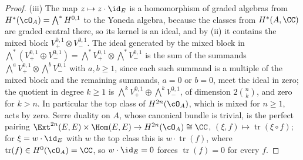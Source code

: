 \begin{proof}
(iii) The map $z\mapsto z\cdot\id_{E}$ is a homomorphism of graded algebras
from $H^{*}(\cO_{A})=\bigwedge^{*}H^{0,1}$ to the Yoneda algebra, because the
classes from $H^{*}(A,\CC)$ are graded central there, so its kernel is an
ideal, and by (ii) it contains the mixed block $V_{+}^{0,1}\otimes V_{-}^{0,1}$.
The ideal generated by the mixed block in $\bigwedge^{*}(V_{+}^{0,1}\oplus
V_{-}^{0,1})=\bigwedge^{*}V_{+}^{0,1}\otimes\bigwedge^{*}V_{-}^{0,1}$ is the
sum of the summands $\bigwedge^{a}V_{+}^{0,1}\otimes\bigwedge^{b}V_{-}^{0,1}$
with $a,b\ge1$, since each such summand is a multiple of the mixed block and
the remaining summands, $a=0$ or $b=0$, meet the ideal in zero; the quotient in
degree $k\ge1$ is $\bigwedge^{k}V_{+}^{0,1}\oplus\bigwedge^{k}V_{-}^{0,1}$,
of dimension $2\binom{n}{k}$, and zero for $k>n$. In particular the top class
of $H^{2n}(\cO_{A})$, which is mixed for $n\ge1$, acts by zero. Serre duality
on $A$, whose canonical bundle is trivial, is the perfect pairing
$\Ext^{2n}(E,E)\times\Hom(E,E)\to H^{2n}(\cO_{A})\cong\CC$,
$(\xi,f)\mapsto\operatorname{tr}(\xi\circ f)$; for $\xi=w\cdot\id_{E}$
with $w$ the top class this is $w\cdot\operatorname{tr}(f)$, where
$\operatorname{tr}(f)\in H^{0}(\cO_{A})=\CC$, so $w\cdot\id_{E}=0$ forces
$\operatorname{tr}(f)=0$ for every $f$.


\end{proof}
